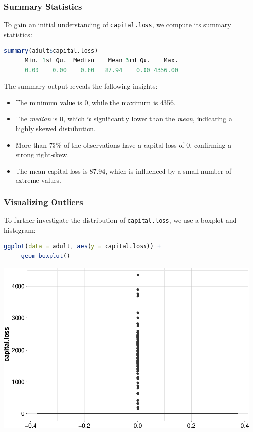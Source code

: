 \documentclass[
]{book}
\newcommand{\passthrough}[1]{#1}
\providecommand{\tightlist}{%
  \setlength{\itemsep}{0pt}\setlength{\parskip}{0pt}}
\theoremstyle{definition}
\theoremstyle{definition}
\theoremstyle{definition}
\theoremstyle{definition}
\theoremstyle{remark}
\begin{document}
\subsubsection*{Summary Statistics}\label{summary-statistics}

To gain an initial understanding of \passthrough{\lstinline!capital.loss!}, we compute its summary statistics:

\begin{lstlisting}[language=R]
summary(adult$capital.loss)
      Min. 1st Qu.  Median    Mean 3rd Qu.    Max. 
      0.00    0.00    0.00   87.94    0.00 4356.00
\end{lstlisting}

The summary output reveals the following insights:

\begin{itemize}
\tightlist
\item
  The minimum value is 0, while the maximum is 4356.\\
\item
  The \emph{median} is 0, which is significantly lower than the \emph{mean}, indicating a highly skewed distribution.\\
\item
  More than 75\% of the observations have a capital loss of 0, confirming a strong right-skew.\\
\item
  The mean capital loss is 87.94, which is influenced by a small number of extreme values.
\end{itemize}

\subsubsection*{Visualizing Outliers}\label{visualizing-outliers}

To further investigate the distribution of \passthrough{\lstinline!capital.loss!}, we use a boxplot and histogram:

\begin{lstlisting}[language=R]
ggplot(data = adult, aes(y = capital.loss)) +
     geom_boxplot()
\end{lstlisting}

\begin{center}\includegraphics[width=0.7\linewidth]{data-preparation_files/figure-latex/unnamed-chunk-26-1} \end{center}
\end{document}
